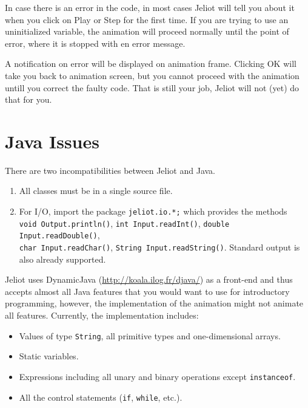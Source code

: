 \documentclass[a4paper,11pt,english]{article}
\newcommand{\jel}{Jeliot}
\newcommand{\p}[1]{\texttt{#1}}
\newcommand{\bu}[1]{\textsf{#1}}
\begin{document}
{In case there is an error in the code, in most cases \jel{} will tell you about it when you click on \bu{Play} or \bu{Step} for the first time. If you are trying to use an uninitialized variable, the animation will proceed normally until the point of error, where it is stopped with en error message.

A notification on error will be displayed on animation frame. Clicking \bu{OK} will take you back to animation screen, but you cannot proceed with the animation untill you correct the faulty code. That is still your job, \jel{} will not (yet) do that for you.


\section{Java Issues}

There are two incompatibilities between \jel{} and Java.

\begin{enumerate}
\item All classes must be in a single source file.

\item For I/O, import the package \p{jeliot.io.*;} which provides the  methods\\
    \p{void Output.println()}, \p{int Input.readInt()}, \p{double  Input.readDouble()},\\
    \p{char Input.readChar()}, \p{String  Input.readString()}. Standard output is also already supported.
\end{enumerate}

\jel{} uses DynamicJava (\url{http://koala.ilog.fr/djava/}) as a front-end and thus accepts almost all Java features that you would want to use for introductory programming, however, the implementation of the animation might not animate all features. Currently, the implementation includes:

\begin{itemize}

	\item Values of type \p{String}, all primitive types and one-dimensional arrays.

	\item Static variables.

	\item Expressions including all unary and binary operations except \p{instanceof}.

	\item All the control statements (\p{if}, \p{while}, etc.).


\end{itemize}}
\end{document}
